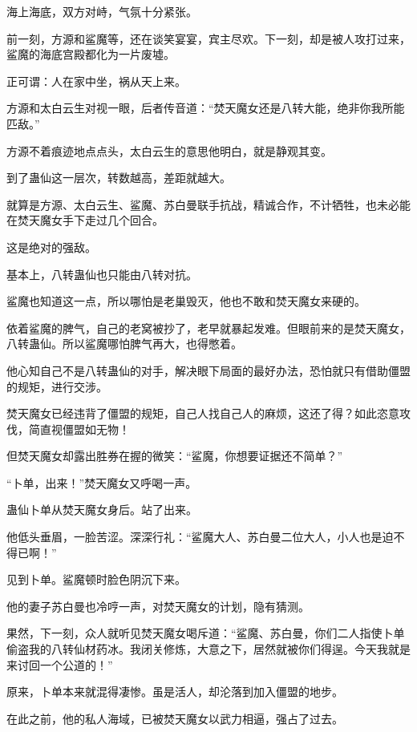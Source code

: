
\begin{this_body}

海上海底，双方对峙，气氛十分紧张。

前一刻，方源和鲨魔等，还在谈笑宴宴，宾主尽欢。下一刻，却是被人攻打过来，鲨魔的海底宫殿都化为一片废墟。

正可谓：人在家中坐，祸从天上来。

方源和太白云生对视一眼，后者传音道：“焚天魔女还是八转大能，绝非你我所能匹敌。”

方源不着痕迹地点点头，太白云生的意思他明白，就是静观其变。

到了蛊仙这一层次，转数越高，差距就越大。

就算是方源、太白云生、鲨魔、苏白曼联手抗战，精诚合作，不计牺牲，也未必能在焚天魔女手下走过几个回合。

这是绝对的强敌。

基本上，八转蛊仙也只能由八转对抗。

鲨魔也知道这一点，所以哪怕是老巢毁灭，他也不敢和焚天魔女来硬的。

依着鲨魔的脾气，自己的老窝被抄了，老早就暴起发难。但眼前来的是焚天魔女，八转蛊仙。所以鲨魔哪怕脾气再大，也得憋着。

他心知自己不是八转蛊仙的对手，解决眼下局面的最好办法，恐怕就只有借助僵盟的规矩，进行交涉。

焚天魔女已经违背了僵盟的规矩，自己人找自己人的麻烦，这还了得？如此恣意攻伐，简直视僵盟如无物！

但焚天魔女却露出胜券在握的微笑：“鲨魔，你想要证据还不简单？”

“卜单，出来！”焚天魔女又呼喝一声。

蛊仙卜单从焚天魔女身后。站了出来。

他低头垂眉，一脸苦涩。深深行礼：“鲨魔大人、苏白曼二位大人，小人也是迫不得已啊！”

见到卜单。鲨魔顿时脸色阴沉下来。

他的妻子苏白曼也冷哼一声，对焚天魔女的计划，隐有猜测。

果然，下一刻，众人就听见焚天魔女喝斥道：“鲨魔、苏白曼，你们二人指使卜单偷盗我的八转仙材药冰。我闭关修炼，大意之下，居然就被你们得逞。今天我就是来讨回一个公道的！”

原来，卜单本来就混得凄惨。虽是活人，却沦落到加入僵盟的地步。

在此之前，他的私人海域，已被焚天魔女以武力相逼，强占了过去。


\end{this_body}
